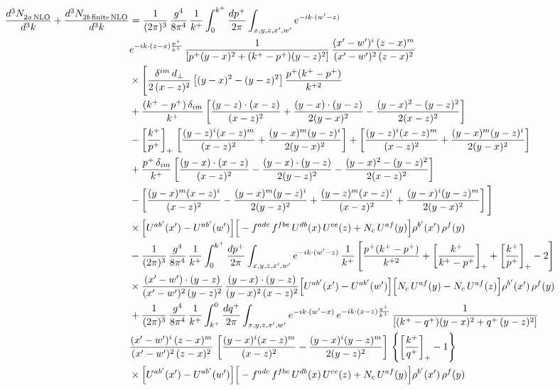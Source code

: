 \documentclass[10pt]{article}
\begin{document}
\begin{align}
    \frac{d^{3}N_{2a\,\rm NLO}^{\rm}}{d^{3}k}+\frac{d^{3}N_{2b\,\rm finite\, NLO}^{\rm}}{d^{3}k} & = \frac{1}{(2\pi)^{3}}\,\frac{g^{4}}{8\pi^{4}}\,\frac{1}{k^{+}}\int_{0}^{k^{+}}\frac{dp^{+}}{2\pi}\int_{x,y,z,x',w'}e^{-ik\cdot(w'-z)}\notag \\ & e^{-ik\cdot(z-x)\frac{p^{+}}{k^{+}}}\,\frac{1}{\left[p^{+}(y-x)^{2}+(k^{+}-p^{+})(y-z)^{2}\right]}\,\frac{(x'-w')^{i}\,(z-x)^{m}}{(x'-w')^{2}\,(z-x)^{2}}\notag\\ &\times\Bigg[\frac{\delta^{im}\,d_{\perp}}{2\,(x-z)^{2}}\left[(y-x)^{2}-(y-z)^{2}\right]\frac{p^{+}(k^{+}-p^{+})}{k^{+2}}
\notag \\ & +\frac{(k^{+}-p^{+})\,\delta_{im}}{k^{+}}\left[\frac{(y-z)\cdot(x-z)}{(x-z)^{2}}+\frac{(y-x)\cdot(y-z)}{2(y-x)^{2}}-\frac{(y-x)^{2}-(y-z)^{2}}{2(x-z)^{2}}\right]\notag\\
&-\left[\frac{k^{+}}{p^{+}}\right]_{+}\,\left[\frac{(y-z)^{i}(x-z)^{m}}{(x-z)^{2}}+\frac{(y-x)^{m}(y-z)^{i}}{2(y-x)^{2}}\right]+\left[\frac{(y-z)^{i}(x-z)^{m}}{(x-z)^{2}}+\frac{(y-x)^{m}(y-z)^{i}}{2(y-x)^{2}}\right]\notag\\
&+\frac{p^{+}\,\delta_{im}}{k^{+}}\left[\frac{(y-x)\cdot(x-z)}{(x-z)^{2}}-\frac{(y-x)\cdot(y-z)}{2(y-z)^{2}}-\frac{(y-x)^{2}-(y-z)^{2}}{2(x-z)^{2}}\right]\notag\\
&-\left[\frac{(y-x)^{m}(x-z)^{i}}{(x-z)^{2}}-\frac{(y-x)^{m}(y-z)^{i}}{2(y-z)^{2}}+\frac{(y-z)^{m}(x-z)^{i}}{(x-z)^{2}}+\frac{(y-x)^{i}(y-z)^{m}}{2(y-x)^{2}}\right]\Bigg]\notag\\
&\times\Big[U^{ab'}(x')-U^{ab'}(w')\Big]\Big[-f^{adc}\,f^{fbe}\,U^{db}(x)\,U^{ce}(z)+N_{c}\,U^{af}(y)\Big]\rho^{b'}(x')\,\rho^{f}(y)\notag \\
&-\frac{1}{(2\pi)^{3}}\,\frac{g^{4}}{8\pi^{4}}\,\frac{1}{k^{+}}\int_{0}^{k^{+}}\frac{dp^{+}}{2\pi}\int_{x,y,z,x',w'}e^{-ik\cdot(w'-z)}\,\frac{1}{k^{+}}\left[\frac{p^{+}(k^{+}-p^{+})}{k^{+2}}+\left[\frac{k^{+}}{k^{+}-p^{+}}\right]_{+}+\left[\frac{k^{+}}{p^{+}}\right]_{+}-2\right]\notag\\
&\times\frac{(x'-w')\cdot(y-z)}{(x'-w')^{2}\,(y-z)^{2}}\,\frac{(y-x)\cdot(y-z)}{(y-x)^{2}\,(x-z)^{2}}\Big[U^{ab'}(x')-U^{ab'}(w')\Big]\Big[N_{c}\,U^{af}(y)-N_{c}\,U^{af}(z)\Big]\rho^{b'}(x')\,\rho^{f}(y)\notag \\
& + \frac{1}{(2\pi)^{3}}\,\frac{g^{4}}{8\pi^{4}}\,\frac{1}{k^{+}}\int_{k^{+}}^{0}\frac{dq^{+}}{2\pi}\int_{x,y,z,x',w'}e^{-ik\cdot(w'-x)}\,e^{-ik\cdot(x-z)\frac{q^{+}}{k^{+}}}\,\frac{1}{\left[(k^{+}-q^{+})(y-x)^{2}+q^{+}\,(y-z)^{2}\right]}\notag \\ & \frac{(x'-w')^{i}\,(z-x)^{m}}{(x'-w')^{2}\,(z-x)^{2}}\,\left[\frac{(y-x)^{i}(x-z)^{m}}{(x-z)^{2}}-\frac{(y-x)^{i}(y-z)^{m}}{2(y-z)^{2}}\right]\,\left\{\left[\frac{k^{+}}{q^{+}}\right]_{+}-1\right\}\notag \\ & \times\Big[U^{ab'}(x')-U^{ab'}(w')\Big]\Big[-f^{adc}\,f^{fbe}\,U^{db}(x)\,U^{ce}(z)+N_{c}\,U^{af}(y)\Big]\rho^{b'}(x')\,\rho^{f}(y)\notag \\

\end{align}
\end{document}
